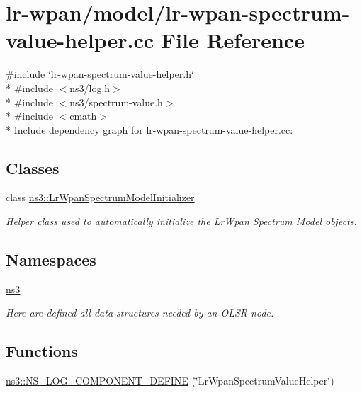 \hypertarget{lr-wpan-spectrum-value-helper_8cc}{}\section{lr-\/wpan/model/lr-\/wpan-\/spectrum-\/value-\/helper.cc File Reference}
\label{lr-wpan-spectrum-value-helper_8cc}
{\ttfamily \#include \char`\"{}lr-\/wpan-\/spectrum-\/value-\/helper.\+h\char`\"{}}\\*
{\ttfamily \#include $<$ns3/log.\+h$>$}\\*
{\ttfamily \#include $<$ns3/spectrum-\/value.\+h$>$}\\*
{\ttfamily \#include $<$cmath$>$}\\*
Include dependency graph for lr-\/wpan-\/spectrum-\/value-\/helper.cc\+:
\subsection*{Classes}
\begin{DoxyCompactItemize}
\item 
class \hyperlink{classns3_1_1LrWpanSpectrumModelInitializer}{ns3\+::\+Lr\+Wpan\+Spectrum\+Model\+Initializer}
\begin{DoxyCompactList}\small\item\em Helper class used to automatically initialize the Lr\+Wpan Spectrum Model objects. \end{DoxyCompactList}\end{DoxyCompactItemize}
\subsection*{Namespaces}
\begin{DoxyCompactItemize}
\item 
 \hyperlink{namespacens3}{ns3}
\begin{DoxyCompactList}\small\item\em Here are defined all data structures needed by an O\+L\+SR node. \end{DoxyCompactList}\end{DoxyCompactItemize}
\subsection*{Functions}
\begin{DoxyCompactItemize}
\item 
\hyperlink{namespacens3_aa9233b637ff212064ab8e902feb495a5}{ns3\+::\+N\+S\+\_\+\+L\+O\+G\+\_\+\+C\+O\+M\+P\+O\+N\+E\+N\+T\+\_\+\+D\+E\+F\+I\+NE} (\char`\"{}Lr\+Wpan\+Spectrum\+Value\+Helper\char`\"{})
\end{DoxyCompactItemize}
